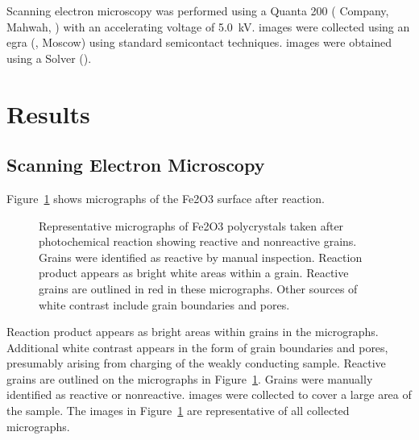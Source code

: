 \documentclass[12pt,%
              twoside,
               letterpaper]{uiothesis}
\begin{document}
Scanning electron microscopy was performed using a Quanta 200  
( Company, Mahwah,
) with an accelerating voltage of \SI{5.0}{\kilo\volt}.  images were
collected using an egra  (, Moscow) using standard
semicontact techniques.  images were obtained using a Solver
 ().


\section{Results}
\label{sec:ch9results}


\subsection{Scanning Electron Microscopy}
\label{subsec:ch9sem}


Figure~\ref{fig:semimages} shows  micrographs of the Fe2O3 surface after
reaction.
\begin{figure}
	\caption[Representative  micrographs after photochemical reaction]{%
		Representative  micrographs of Fe2O3 polycrystals taken after
photochemical reaction showing reactive and nonreactive grains. Grains were identified as 
		reactive by manual inspection. Reaction product appears as bright white areas
within a grain. Reactive 
		grains are outlined in red in these micrographs. Other sources of white contrast
include grain boundaries and 
		pores.}
	\label{fig:semimages}
\end{figure}
Reaction product appears as bright areas within grains in the  micrographs.
Additional white contrast appears in the form of grain boundaries and pores, presumably
arising from charging of the weakly conducting sample. Reactive grains are outlined on the
micrographs in Figure~\ref{fig:semimages}. Grains were manually identified as reactive or
nonreactive.  images were collected to cover a large area of the sample. The
images in Figure~\ref{fig:semimages} are representative of all collected micrographs.
\end{document}
